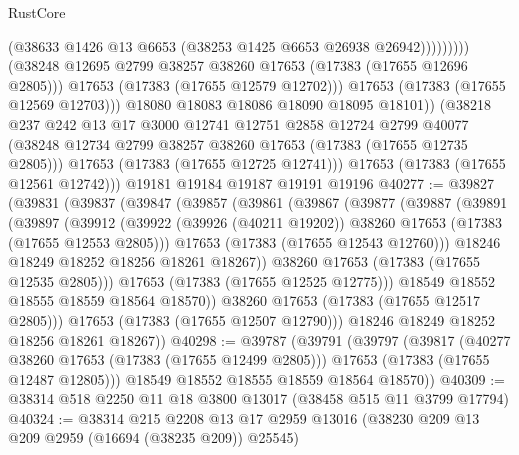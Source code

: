 \begin{lexlean}{RustCore}
\begin{coremodule}
                            (@38633 @1426 @13 @6653 (@38253 @1425 @6653 @26938 @26942)))))))))
              (@38248 @12695 @2799 @38257 @38260 @17653 (@17383 (@17655 @12696 @2805)))
              @17653
              (@17383 (@17655 @12579 @12702)))
            @17653
            (@17383 (@17655 @12569 @12703)))
          @18080
          @18083
          @18086
          @18090
          @18095
          @18101))
      (@38218
        @237
        @242
        @13
        @17
        @3000
        @12741
        @12751
        @2858
        @12724
        @2799
        @40077
        (@38248 @12734 @2799 @38257 @38260 @17653 (@17383 (@17655 @12735 @2805)))
        @17653
        (@17383 (@17655 @12725 @12741)))
      @17653
      (@17383 (@17655 @12561 @12742)))
    @19181
    @19184
    @19187
    @19191
    @19196
@40277 := @39827
    (@39831
      (@39837
        (@39847
          (@39857
            (@39861
              (@39867
                (@39877
                  (@39887
                    (@39891
                      (@39897
                        (@39912
                          (@39922
                            (@39926 (@40211 @19202))
                            @38260
                            @17653
                            (@17383 (@17655 @12553 @2805)))
                          @17653
                          (@17383 (@17655 @12543 @12760)))
                        @18246
                        @18249
                        @18252
                        @18256
                        @18261
                        @18267))
                    @38260
                    @17653
                    (@17383 (@17655 @12535 @2805)))
                  @17653
                  (@17383 (@17655 @12525 @12775)))
                @18549
                @18552
                @18555
                @18559
                @18564
                @18570))
            @38260
            @17653
            (@17383 (@17655 @12517 @2805)))
          @17653
          (@17383 (@17655 @12507 @12790)))
        @18246
        @18249
        @18252
        @18256
        @18261
        @18267))
@40298 := @39787
    (@39791
      (@39797
        (@39817
          (@40277 @38260 @17653 (@17383 (@17655 @12499 @2805)))
          @17653
          (@17383 (@17655 @12487 @12805)))
        @18549
        @18552
        @18555
        @18559
        @18564
        @18570))
@40309 := @38314 @518 @2250 @11 @18 @3800 @13017 (@38458 @515 @11 @3799 @17794)
@40324 := @38314
    @215
    @2208
    @13
    @17
    @2959
    @13016
    (@38230 @209 @13 @209 @2959 (@16694 (@38235 @209)) @25545)

\end{coremodule}
\end{lexlean}
